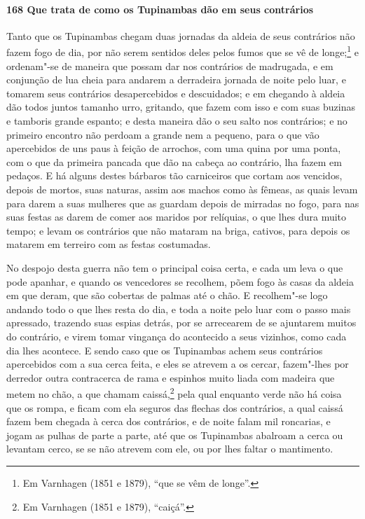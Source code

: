 \paragraph{168 Que trata de como os Tupinambas dão em seus contrários}

Tanto que os Tupinambas chegam duas jornadas da aldeia de seus contrários não fazem fogo
de dia, por não serem sentidos deles pelos fumos que se vê de longe;\footnote{ Em
Varnhagen (1851 e 1879), ``que se vêm de longe''.} e ordenam"-se de maneira que possam dar
nos contrários de madrugada, e em conjunção de lua cheia para andarem a derradeira jornada
de noite pelo luar, e tomarem seus contrários desapercebidos e descuidados; e em chegando
à aldeia dão todos juntos tamanho urro, gritando, que fazem com isso e com suas buzinas e
tamboris grande espanto; e desta maneira dão o seu salto nos contrários; e no primeiro
encontro não perdoam a grande nem a pequeno, para o que vão apercebidos de uns paus à
feição de arrochos, com uma quina por uma ponta, com o que da primeira pancada que dão na
cabeça ao contrário, lha fazem em pedaços. E há alguns destes bárbaros tão carniceiros que
cortam aos vencidos, depois de mortos, suas naturas, assim aos machos como às fêmeas, as
quais levam para darem a suas mulheres que as guardam depois de mirradas no fogo, para nas
suas festas as darem de comer aos maridos por relíquias, o que lhes dura muito tempo; e
levam os contrários que não mataram na briga, cativos, para depois os matarem em terreiro
com as festas costumadas.

No despojo desta guerra não tem o principal coisa certa, e cada um leva o que pode
apanhar, e quando os vencedores se recolhem, põem fogo às casas da aldeia em que deram,
que são cobertas de palmas até o chão. E recolhem"-se logo andando todo o que lhes resta do
dia, e toda a noite pelo luar com o passo mais apressado, trazendo suas espias detrás, por
se arrecearem de se ajuntarem muitos do contrário, e virem tomar vingança do acontecido a
seus vizinhos, como cada dia lhes acontece. E sendo caso que os Tupinambas achem seus
contrários apercebidos com a sua cerca feita, e eles se atrevem a os cercar, fazem"-lhes
por derredor outra contracerca de rama e espinhos muito liada com madeira que metem no
chão, a que chamam caissá,\footnote{ Em Varnhagen (1851 e 1879), ``caiçá''.} pela qual
enquanto verde não há coisa que os rompa, e ficam com ela seguros das flechas dos
contrários, a qual caissá fazem bem chegada à cerca dos contrários, e de noite falam mil
roncarias, e jogam as pulhas de parte a parte, até que os Tupinambas abalroam a cerca ou
levantam cerco, se se não atrevem com ele, ou por lhes faltar o mantimento.

